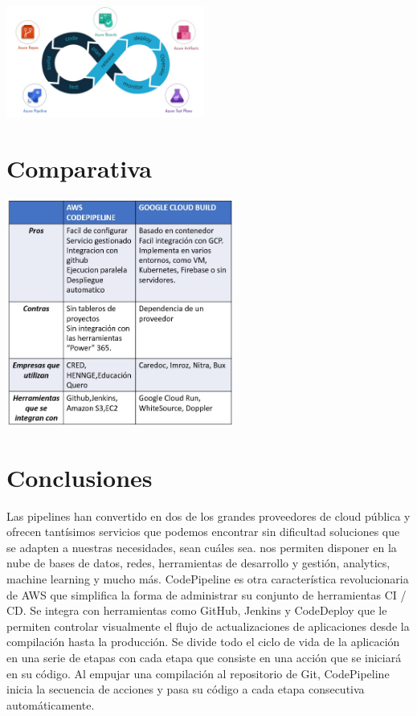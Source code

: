 \documentclass[twoside,twocolumn]{article}
\begin{document}
\begin{itemize}
 \begin{center}
	\includegraphics[width=6.5cm]{./imagenes/devops.jpeg} 
	\end{center}	
\end{itemize}
\section{Comparativa}
 \begin{center}
	\includegraphics[width=7.5cm]{./imagenes/comparativa.jpg} 
	\end{center}

\section{Conclusiones}
Las pipelines han convertido en dos de los grandes proveedores de cloud pública y ofrecen tantísimos servicios que podemos encontrar sin dificultad soluciones que se adapten a nuestras necesidades, sean cuáles sea. nos permiten disponer en la nube de bases de datos, redes, herramientas de desarrollo y gestión, analytics, machine learning y mucho más. CodePipeline es otra característica revolucionaria de AWS que simplifica la forma de administrar su conjunto de herramientas CI / CD. Se integra con herramientas como GitHub, Jenkins y CodeDeploy que le permiten controlar visualmente el flujo de actualizaciones de aplicaciones desde la compilación hasta la producción. Se divide todo el ciclo de vida de la aplicación en una serie de etapas con cada etapa que consiste en una acción que se iniciará en su código. Al empujar una compilación al repositorio de Git, CodePipeline inicia la secuencia de acciones y pasa su código a cada etapa consecutiva automáticamente.
\end{document}
